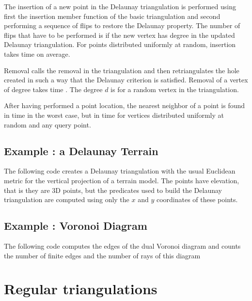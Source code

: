 The insertion of a new point in the Delaunay triangulation
is performed using first the insertion member function
of the basic triangulation and second 
performing a sequence of flips to restore the Delaunay property. 
The number of flips that have to be performed is 
if the new vertex has degree  in the updated
Delaunay triangulation. For
points distributed uniformly at random, insertion takes time  on
average.

Removal calls the removal in the triangulation and then retriangulates
the hole created in such a way that  the Delaunay criterion is
satisfied. Removal of a
vertex of degree  takes time .
The degree $d$ is  for a random
vertex in the triangulation.

After having performed a  point location, the
nearest neighbor of a point is found in time  in the
worst case, but in time 
for vertices distributed uniformly at random  and any query point. 


\subsection{Example : a Delaunay Terrain}
\label{Subsection_2D_Triangulations_Delaunay_Terrain}

The following code  creates a Delaunay triangulation with 
the usual Euclidean metric for the vertical projection of a 
terrain model. The points have elevation, that is they are 3D points,
but the predicates used to build the  Delaunay triangulation
are computed using only  the $x$ and $y$ coordinates  
of these points. 

\subsection{Example : Voronoi Diagram}
\label{Subsection_2D_Triangulations_Voronoi}
The following code computes the edges of the dual Voronoi diagram
and counts  the number of finite edges and the number of rays
of this diagram


\section{Regular triangulations}
\label{Section_2D_Triangulations_Regular}

